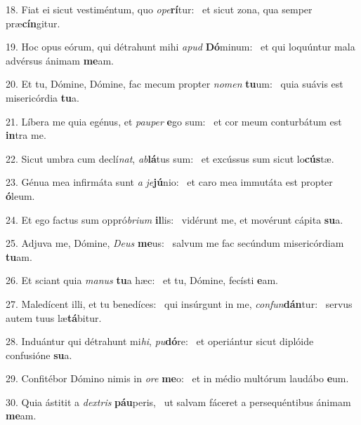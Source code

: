 18. Fiat ei sicut vestiméntum, quo \textit{o}\textit{pe}\textbf{rí}tur: \ast\  et sicut zona, qua semper præ\textbf{cín}gitur.\

19. Hoc opus eórum, qui détrahunt mihi \textit{a}\textit{pud} \textbf{Dó}minum: \ast\  et qui loquúntur mala advérsus ánimam \textbf{me}am.\

20. Et tu, Dómine, Dómine, fac mecum propter \textit{no}\textit{men} \textbf{tu}um: \ast\  quia suávis est misericórdia \textbf{tu}a.\

21. Líbera me quia egénus, et \textit{pau}\textit{per} \textbf{e}go sum: \ast\  et cor meum conturbátum est \textbf{in}tra me.\

22. Sicut umbra cum declí\textit{nat}, \textit{ab}\textbf{lá}tus sum: \ast\  et excússus sum sicut lo\textbf{cús}tæ.\

23. Génua mea infirmáta sunt \textit{a} \textit{je}\textbf{jú}nio: \ast\  et caro mea immutáta est propter \textbf{ó}leum.\

24. Et ego factus sum oppró\textit{bri}\textit{um} \textbf{il}lis: \ast\  vidérunt me, et movérunt cápita \textbf{su}a.\

25. Adjuva me, Dómine, \textit{De}\textit{us} \textbf{me}us: \ast\  salvum me fac secúndum misericórdiam \textbf{tu}am.\

26. Et sciant quia \textit{ma}\textit{nus} \textbf{tu}a hæc: \ast\  et tu, Dómine, fecísti \textbf{e}am.\

27. Maledícent illi, et tu benedíces: \dag\  qui insúrgunt in me, \textit{con}\textit{fun}\textbf{dán}tur: \ast\  servus autem tuus læ\textbf{tá}bitur.\

28. Induántur qui détrahunt mi\textit{hi}, \textit{pu}\textbf{dó}re: \ast\  et operiántur sicut diplóide confusióne \textbf{su}a.\

29. Confitébor Dómino nimis in \textit{o}\textit{re} \textbf{me}o: \ast\  et in médio multórum laudábo \textbf{e}um.\

30. Quia ástitit a \textit{dex}\textit{tris} \textbf{páu}peris, \ast\  ut salvam fáceret a persequéntibus ánimam \textbf{me}am.\

